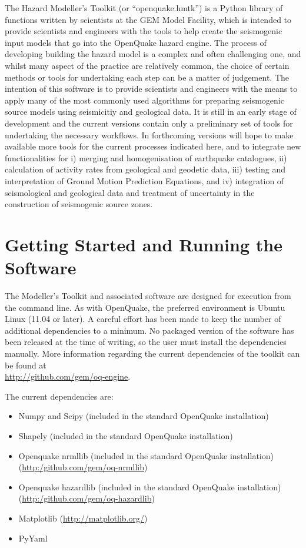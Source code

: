 The Hazard Modeller's Toolkit (or ``openquake.hmtk'') is a Python library of functions written by scientists at the GEM Model Facility, which is intended to provide 
scientists and engineers with the tools to help create the seismogenic 
input models that go into the OpenQuake hazard engine. The process of 
developing building the hazard model is a complex and often challenging 
one, and whilst many aspect of the practice are relatively common, the 
choice of certain methods or tools for undertaking each step can be a 
matter of judgement. The intention of this software is to provide 
scientists and engineers with the means to apply many of the most 
commonly used algorithms for preparing seismogenic source models 
using seismicitiy and geological data. It is still in an early 
stage of development and the current versions contain only a preliminary
set of tools for undertaking the necessary workflows. In forthcoming 
versions will hope to make available more tools for the current processes
indicated here, and to integrate new functionalities for i) merging and
homogenisation of earthquake catalogues, ii) calculation of activity 
rates from geological and geodetic data, iii) testing and interpretation
of Ground Motion Prediction Equations, and iv) integration of 
seismological and geological data and treatment of uncertainty 
in the construction of seismogenic source zones.

\section{Getting Started and Running the Software}
The Modeller's Toolkit and associated software are designed for execution 
from the command line. As with OpenQuake, the preferred environment is 
Ubuntu Linux (11.04 or later). A careful effort has been made to keep 
the number of additional dependencies to a minimum. No packaged version of the software has been released at the time of writing, so the user must install the dependencies manually. More information regarding the current dependencies of the toolkit can be found at \hfill \\
\href{http://github.com/GEMScienceTools/openquake.hmtk}{http://github.com/gem/oq-engine}. 

The current dependencies are:
\begin{itemize}
\item Numpy and Scipy (included in the standard OpenQuake installation)
\item Shapely (included in the standard OpenQuake installation)
\item Openquake nrmllib (included in the standard OpenQuake installation) 
    \hfill \\ (\href{http:/github.com/gem/oq-nrmllib}{http:/github.com/gem/oq-nrmllib}) 
\item Openquake hazardlib (included in the standard OpenQuake installation) 
    \hfill \\ (\href{http:/github.com/gem/oq-hazardlib}{http:/github.com/gem/oq-hazardlib})
\item Matplotlib (\href{http://matplotlib.org/}{http://matplotlib.org/})
\item PyYaml
\end{itemize}

